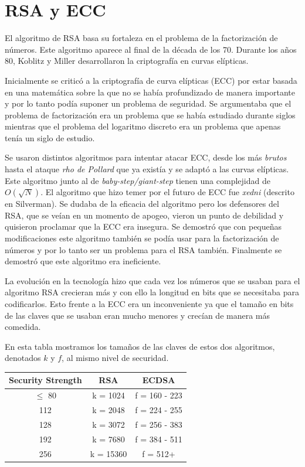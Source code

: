 \documentclass{article}
\begin{document}
\newpage

\section{RSA y ECC}

El algoritmo de RSA basa su fortaleza en el problema de la
factorización de números. Este algoritmo aparece al final de la década
de los 70. Durante los años 80, Koblitz y Miller desarrollaron la
criptografía en curvas elípticas.

Inicialmente se criticó a la criptografía de curva elípticas (ECC) por
estar basada en una matemática sobre la que no se había profundizado
de manera importante y por lo tanto podía suponer un problema de
seguridad. Se argumentaba que el problema de factorización era un
problema que se había estudiado durante siglos mientras que el
problema del logaritmo discreto era un problema que apenas tenía un
siglo de estudio.

Se usaron distintos algoritmos para intentar atacar ECC, desde los más
\textit{brutos} hasta el ataque \emph{rho de Pollard} que ya existía y
se adaptó a las curvas elípticas. Este algoritmo junto al de
\textit{baby-step/giant-step} tienen una complejidad de
$O(\sqrt{N})$. El algoritmo que hizo temer por el futuro de ECC fue
\textit{xedni} (descrito en Silverman). Se dudaba de la eficacia del
algoritmo pero los defensores del RSA, que se veían en un momento de
apogeo, vieron un punto de debilidad y quisieron proclamar que la ECC
era insegura. Se demostró que con pequeñas modificaciones este
algoritmo también se podía usar para la factorización de números y por
lo tanto ser un problema para el RSA también. Finalmente se demostró
que este algoritmo era ineficiente.

La evolución en la tecnología hizo que cada vez los números que se
usaban para el algoritmo RSA crecieran más y con ello la longitud en
bits que se necesitaba para codificarlos. Esto frente a la ECC era un
inconveniente ya que el tamaño en bits de las claves que se usaban
eran mucho menores y crecían de manera más comedida.

En esta tabla mostramos los tamaños de las claves de estos dos algoritmos, denotados $k$ y $f$, al mismo nivel de securidad.

\begin{table}[H]
\centering
\begin{tabular}{|c|c|c|}
\hline
\textbf{Security Strength} & \textbf{RSA} & \textbf{ECDSA} \\ \hline
$\leq$ 80                  & k = 1024       & f = 160 - 223  \\
112                        & k = 2048     & f = 224 - 255  \\
128                        & k = 3072     & f = 256 - 383  \\
192                        & k = 7680     & f = 384 - 511  \\
256                        & k = 15360    & f = 512+       \\ \hline
\end{tabular}
\end{table}
\end{document}
